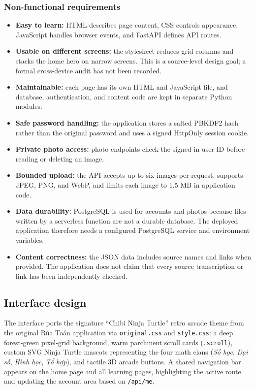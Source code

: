 \subsubsection{Non-functional requirements}
\begin{itemize}
  \item \textbf{Easy to learn:} HTML describes page content, CSS controls appearance, JavaScript handles browser events, and FastAPI defines API routes.
  \item \textbf{Usable on different screens:} the stylesheet reduces grid columns and stacks the home hero on narrow screens. This is a source-level design goal; a formal cross-device audit has not been recorded.
  \item \textbf{Maintainable:} each page has its own HTML and JavaScript file, and database, authentication, and content code are kept in separate Python modules.
  \item \textbf{Safe password handling:} the application stores a salted PBKDF2 hash rather than the original password and uses a signed HttpOnly session cookie.
  \item \textbf{Private photo access:} photo endpoints check the signed-in user ID before reading or deleting an image.
  \item \textbf{Bounded upload:} the API accepts up to six images per request, supports JPEG, PNG, and WebP, and limits each image to 1.5 MB in application code.
  \item \textbf{Data durability:} PostgreSQL is used for accounts and photos because files written by a serverless function are not a durable database. The deployed application therefore needs a configured PostgreSQL service and environment variables.
  \item \textbf{Content correctness:} the JSON data includes source names and links when provided. The application does not claim that every source transcription or link has been independently checked.
\end{itemize}

\subsection{Interface design}
The interface ports the signature ``Chibi Ninja Turtle'' retro arcade theme from the original Rùa Toán application via \texttt{original.css} and \texttt{style.css}: a deep forest-green pixel-grid background, warm parchment scroll cards (\texttt{.scroll}), custom SVG Ninja Turtle mascots representing the four math clans (\textit{Số học}, \textit{Đại số}, \textit{Hình học}, \textit{Tổ hợp}), and tactile 3D arcade buttons. A shared navigation bar appears on the home page and all learning pages, highlighting the active route and updating the account area based on \texttt{/api/me}.

